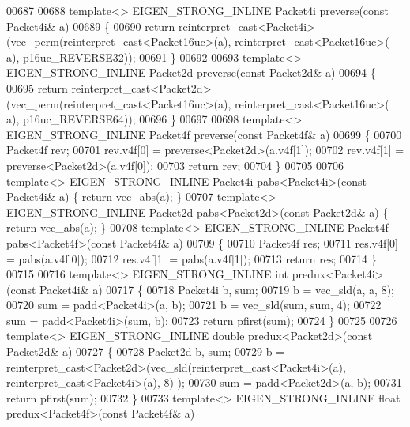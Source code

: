 \begin{DoxyCode}
{00687 
00688 \textcolor{keyword}{template}<> EIGEN\_STRONG\_INLINE Packet4i preverse(\textcolor{keyword}{const} Packet4i& a)
00689 \{
00690   \textcolor{keywordflow}{return} \textcolor{keyword}{reinterpret\_cast<}Packet4i\textcolor{keyword}{>}(vec\_perm(reinterpret\_cast<Packet16uc>(a), reinterpret\_cast<Packet16uc>(
      a), p16uc\_REVERSE32));
00691 \}
00692 
00693 \textcolor{keyword}{template}<> EIGEN\_STRONG\_INLINE Packet2d preverse(\textcolor{keyword}{const} Packet2d& a)
00694 \{
00695   \textcolor{keywordflow}{return} \textcolor{keyword}{reinterpret\_cast<}Packet2d\textcolor{keyword}{>}(vec\_perm(reinterpret\_cast<Packet16uc>(a), reinterpret\_cast<Packet16uc>(
      a), p16uc\_REVERSE64));
00696 \}
00697 
00698 \textcolor{keyword}{template}<> EIGEN\_STRONG\_INLINE Packet4f preverse(\textcolor{keyword}{const} Packet4f& a)
00699 \{
00700   Packet4f rev;
00701   rev.v4f[0] = preverse<Packet2d>(a.v4f[1]);
00702   rev.v4f[1] = preverse<Packet2d>(a.v4f[0]);
00703   \textcolor{keywordflow}{return} rev;
00704 \}
00705 
00706 \textcolor{keyword}{template}<> EIGEN\_STRONG\_INLINE Packet4i pabs<Packet4i>(\textcolor{keyword}{const} Packet4i& a) \{ \textcolor{keywordflow}{return} vec\_abs(a); \}
00707 \textcolor{keyword}{template}<> EIGEN\_STRONG\_INLINE Packet2d pabs<Packet2d>(\textcolor{keyword}{const} Packet2d& a) \{ \textcolor{keywordflow}{return} vec\_abs(a); \}
00708 \textcolor{keyword}{template}<> EIGEN\_STRONG\_INLINE Packet4f pabs<Packet4f>(\textcolor{keyword}{const} Packet4f& a)
00709 \{
00710   Packet4f res;
00711   res.v4f[0] = pabs(a.v4f[0]);
00712   res.v4f[1] = pabs(a.v4f[1]);
00713   \textcolor{keywordflow}{return} res;
00714 \}
00715 
00716 \textcolor{keyword}{template}<> EIGEN\_STRONG\_INLINE \textcolor{keywordtype}{int} predux<Packet4i>(\textcolor{keyword}{const} Packet4i& a)
00717 \{
00718   Packet4i b, sum;
00719   b   = vec\_sld(a, a, 8);
00720   sum = padd<Packet4i>(a, b);
00721   b   = vec\_sld(sum, sum, 4);
00722   sum = padd<Packet4i>(sum, b);
00723   \textcolor{keywordflow}{return} pfirst(sum);
00724 \}
00725 
00726 \textcolor{keyword}{template}<> EIGEN\_STRONG\_INLINE \textcolor{keywordtype}{double} predux<Packet2d>(\textcolor{keyword}{const} Packet2d& a)
00727 \{
00728   Packet2d b, sum;
00729   b   = \textcolor{keyword}{reinterpret\_cast<}Packet2d\textcolor{keyword}{>}(vec\_sld(reinterpret\_cast<Packet4i>(a), reinterpret\_cast<Packet4i>(a), 8)
      );
00730   sum = padd<Packet2d>(a, b);
00731   \textcolor{keywordflow}{return} pfirst(sum);
00732 \}
00733 \textcolor{keyword}{template}<> EIGEN\_STRONG\_INLINE \textcolor{keywordtype}{float} predux<Packet4f>(\textcolor{keyword}{const} Packet4f& a)
}
\end{DoxyCode}
